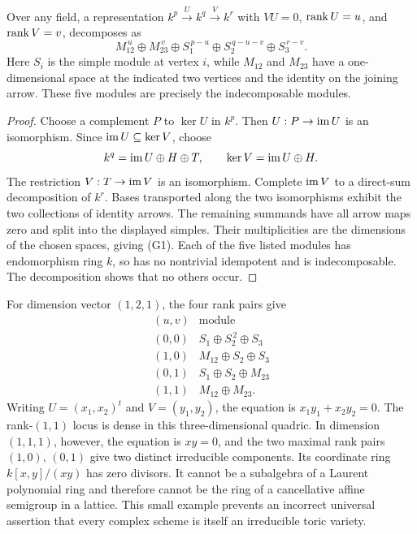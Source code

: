 \begin{proposition}
Over any field, a representation \(k^p\xrightarrow{U}k^q\xrightarrow{V}k^r\) with \(VU=0\), \(\operatorname{rank} U=u\), and \(\operatorname{rank} V=v\), decomposes as
\[
 M_{12}^{\,u}\oplus M_{23}^{\,v}
 \oplus S_1^{\,p-u}\oplus S_2^{\,q-u-v}\oplus S_3^{\,r-v}.
 \tag{G1}\label{eq:gentle-a3-decomp}
\]
Here \(S_i\) is the simple module at vertex \(i\), while \(M_{12}\) and \(M_{23}\) have a one-dimensional space at the indicated two vertices and the identity on the joining arrow. These five modules are precisely the indecomposable modules.
\end{proposition}
\begin{proof}
Choose a complement \(P\) to \(\ker U\) in \(k^p\). Then \(U:P\to\operatorname{im} U\) is an isomorphism. Since \(\operatorname{im} U\subseteq\ker V\), choose
\[
 k^q=\operatorname{im} U\oplus H\oplus T,\qquad \ker V=\operatorname{im} U\oplus H.
\]
The restriction \(V:T\to\operatorname{im} V\) is an isomorphism. Complete \(\operatorname{im} V\) to a direct-sum decomposition of \(k^r\). Bases transported along the two isomorphisms exhibit the two collections of identity arrows. The remaining summands have all arrow maps zero and split into the displayed simples. Their multiplicities are the dimensions of the chosen spaces, giving (G1). Each of the five listed modules has endomorphism ring \(k\), so has no nontrivial idempotent and is indecomposable. The decomposition shows that no others occur.
\end{proof}

For dimension vector \((1,2,1)\), the four rank pairs give
\[
\begin{array}{c|l}
(u,v)&\text{module}\\ \hline
(0,0)&S_1\oplus S_2^{\,2}\oplus S_3\\
(1,0)&M_{12}\oplus S_2\oplus S_3\\
(0,1)&S_1\oplus S_2\oplus M_{23}\\
(1,1)&M_{12}\oplus M_{23}.
\end{array}
\]
Writing \(U=(x_1,x_2)^t\) and \(V=(y_1,y_2)\), the equation is \(x_1y_1+x_2y_2=0\). The rank-\((1,1)\) locus is dense in this three-dimensional quadric. In dimension \((1,1,1)\), however, the equation is \(xy=0\), and the two maximal rank pairs \((1,0)\), \((0,1)\) give two distinct irreducible components. Its coordinate ring \(k[x,y]/(xy)\) has zero divisors. It cannot be a subalgebra of a Laurent polynomial ring and therefore cannot be the ring of a cancellative affine semigroup in a lattice. This small example prevents an incorrect universal assertion that every complex scheme is itself an irreducible toric variety.

